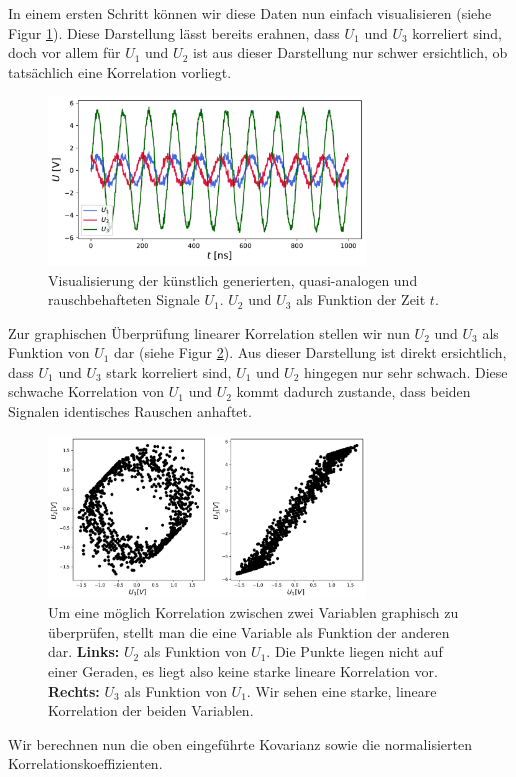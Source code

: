 In einem ersten Schritt können wir diese Daten nun einfach visualisieren (siehe Figur \ref{fig:Us}). Diese Darstellung lässt bereits erahnen, dass $U_1$ und $U_3$ korreliert sind, doch vor allem für  $U_1$ und $U_2$ ist aus dieser Darstellung nur schwer ersichtlich, ob tatsächlich eine Korrelation vorliegt. 

\begin{figure}[H]
\centering
\includegraphics[width=0.75\textwidth]{Figures/Usplot.pdf}
\caption{Visualisierung der künstlich generierten, quasi-analogen und rauschbehafteten Signale $U_1$. $U_2$ und $U_3$ als Funktion der Zeit $t$.}
\label{fig:Us}
\end{figure}

Zur graphischen Überprüfung linearer Korrelation stellen wir nun $U_2$ und $U_3$ als Funktion von $U_1$ dar (siehe Figur \ref{fig:korrUs}). Aus dieser Darstellung ist direkt ersichtlich, dass $U_1$ und $U_3$ stark korreliert sind, $U_1$ und $U_2$ hingegen nur sehr schwach. Diese schwache Korrelation von $U_1$ und $U_2$ kommt dadurch zustande, dass beiden Signalen identisches Rauschen anhaftet. 

\begin{figure}[H]
\centering
\includegraphics[width=0.75\textwidth]{Figures/Uskorrplot.pdf}
\caption{Um eine möglich Korrelation zwischen zwei Variablen graphisch zu überprüfen, stellt man die eine Variable als Funktion der anderen dar. \textbf{Links:} $U_2$ als Funktion von $U_1$. Die Punkte liegen nicht auf einer Geraden, es liegt also keine starke lineare Korrelation vor. \textbf{Rechts:} $U_3$ als Funktion von $U_1$. Wir sehen eine starke, lineare Korrelation der beiden Variablen.}
\label{fig:korrUs}
\end{figure}
Wir berechnen nun die oben eingeführte Kovarianz sowie die normalisierten Korrelationskoeffizienten.

